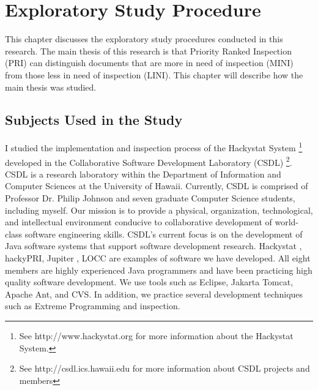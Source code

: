 

\chapter{Exploratory Study Procedure}
\label{chapter:evaluation}
This chapter discusses the exploratory study procedures conducted in this
research. The main thesis of this research is that Priority Ranked
Inspection (PRI) can distinguish documents that are more in need of
inspection (MINI) from those less in need of inspection (LINI). This
chapter will describe how the main thesis was studied.


\section{Subjects Used in the Study}
\label{section:evaluation-subjects}
I studied the implementation and inspection process of the Hackystat System
\footnote{See http://www.hackystat.org for more information about the
  Hackystat System.} developed in the Collaborative Software Development
Laboratory (CSDL) \footnote{See http://csdl.ics.hawaii.edu for more
  information about CSDL projects and members}. CSDL is a research
laboratory within the Department of Information and Computer Sciences at
the University of Hawaii. Currently, CSDL is comprised of Professor Dr.
Philip Johnson and seven graduate Computer Science students, including
myself. Our mission is to provide a physical, organization, technological,
and intellectual environment conducive to collaborative development of
world-class software engineering skills. CSDL's current focus is on the
development of Java software systems that support software development
research. Hackystat \cite{Johnson05}, hackyPRI, Jupiter \cite{Jupiter},
LOCC \cite{Locc} are examples of software we have developed. All eight
members are highly experienced Java programmers and have been practicing
high quality software development. We use tools such as Eclipse, Jakarta
Tomcat, Apache Ant, and CVS. In addition, we practice several development
techniques such as Extreme Programming and inspection.

